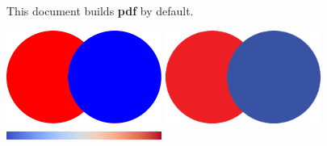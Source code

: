 \documentclass{article}
\begin{document}
\Large
\noindent
This document builds \textbf{\Huge pdf} by default.

\includegraphics[width=2in]{images/Circles_pdf}
\includegraphics[width=2in]{images/Circles_eps}
\includegraphics[width=2in]{images/Cool2WarmBar}
\end{document}
